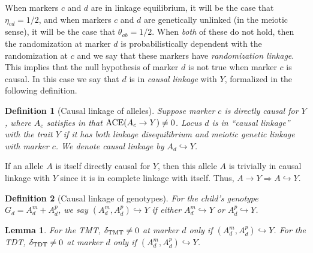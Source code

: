 \documentclass[12pt]{extarticle}
\newtheorem{lem}{Lemma}%
\newtheorem{defin}{Definition}%
\newcommand{\ace}{{\normalfont \text{ACE}}}
\newcommand{\tmt}{{\normalfont \text{TMT}}}
\newcommand{\tdt}{{\normalfont \text{TDT}}}
\begin{document}
{When markers $c$ and $d$ are in linkage equilibrium, it will be the case that $\eta_{cd} = 1/2$, and when markers $c$ and $d$ are genetically unlinked (in the meiotic sense), it will be the case that $\theta_{ab} = 1/2$. When \textit{both} of these do not hold, then the randomization at marker $d$ is probabilistically dependent with the randomization at $c$ and we say that these markers have \textit{randomization linkage}. This implies that the null hypothesis of marker $d$ is not true when marker $c$ is causal. In this case we say that $d$ is in \textit{causal linkage} with $Y$, formalized in the following definition.

\begin{defin}[Causal linkage of alleles]\label{def:causal_link}
Suppose marker $c$ is directly causal for $Y$, where $A_c$ satisfies  in that $\ace(A_c\to Y)\neq 0$. Locus $d$ is in ``causal linkage'' with the trait $Y$ if it has both linkage disequilibrium and meiotic genetic linkage with marker $c$.  We denote causal linkage by $A_d \hookrightarrow Y$.
\end{defin} 

\noindent If an allele $A$ is itself directly causal for $Y$, then this allele $A$ is trivially in causal linkage with $Y$ since it is in complete linkage with itself. Thus, $A \to Y \Rightarrow A \hookrightarrow Y$.

\begin{defin}[Causal linkage of genotypes] \label{def:causal_link_geno}
For the child's genotype $G_d=A^m_d+A^p_d$, we say $(A^m_d,A^p_d) \hookrightarrow Y$ if either $A^m_d \hookrightarrow Y$ or $A^p_d \hookrightarrow Y$.
\end{defin}

\begin{lem}\label{lem:causal_link}
For the TMT, $\delta_{\tmt}\neq 0$ at marker $d$ only if $(A^m_d,A^p_d) \hookrightarrow Y$. For the TDT, $\delta_{\tdt}\neq 0$ at marker $d$ only if $(A^m_d,A^p_d) \hookrightarrow Y$.
\end{lem}

}
\end{document}
